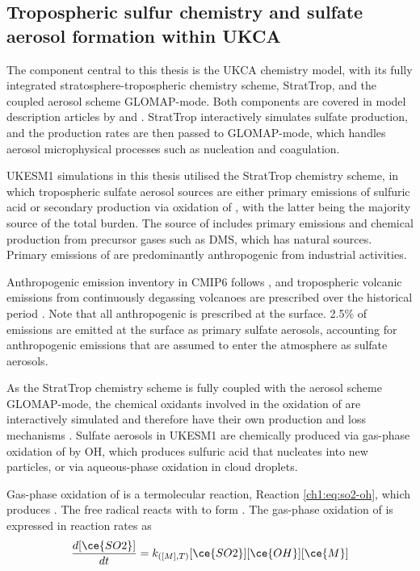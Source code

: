 \subsection{Tropospheric sulfur chemistry and sulfate aerosol formation within UKCA}
\label{ch2:sec:so4-prod-rate}

The component central to this thesis is the UKCA chemistry model, with its fully integrated stratosphere-tropospheric chemistry scheme, StratTrop, and the coupled aerosol scheme GLOMAP-mode. Both components are covered in model description articles by \citet{archibaldDescriptionEvaluationUKCA2020} and \citet{mannDescriptionEvaluationGLOMAPmode2010}. StratTrop interactively simulates sulfate production, and the production rates are then passed to GLOMAP-mode, which handles aerosol microphysical processes such as nucleation and coagulation.


UKESM1 simulations in this thesis utilised the StratTrop chemistry scheme, in which tropospheric sulfate aerosol sources are either primary emissions of sulfuric acid or secondary production via oxidation of , with the latter being the majority source of the total burden. The source of  includes primary emissions and chemical production from precursor gases such as DMS, which has natural sources. Primary emissions of  are predominantly anthropogenic from industrial activities. 


Anthropogenic  emission inventory in CMIP6 follows \citet{hoeslyHistorical175020142018}, and tropospheric volcanic emissions from continuously degassing volcanoes are prescribed over the historical period \citep{andresTimeaveragedInventorySubaerial1998, dentenerEmissionsPrimaryAerosol2006}. Note that all anthropogenic  is prescribed at the surface. 2.5\% of  emissions are emitted at the surface as primary sulfate aerosols, accounting for anthropogenic  emissions that are assumed to enter the atmosphere as sulfate aerosols. 

As the StratTrop chemistry scheme is fully coupled with the aerosol scheme GLOMAP-mode, the chemical oxidants involved in the oxidation of  are interactively simulated and therefore have their own production and loss mechanisms \citep{mulcahyDescriptionEvaluationAerosol2020}. Sulfate aerosols in UKESM1 are chemically produced via gas-phase oxidation of  by OH, which produces sulfuric acid that nucleates into new particles, or via aqueous-phase oxidation in cloud droplets. 

Gas-phase oxidation of  is a termolecular reaction, Reaction \ref{ch1:eq:so2-oh}, which produces . The free radical  reacts with  to form . The gas-phase oxidation of  is expressed in reaction rates as
\begin{align}
    \dfrac{d[\ce{SO2}]}{dt} =  k_{([M],T)} [\ce{SO2}][\ce{OH}][\ce{M}] \label{ch4:eq:so2-oh-prod}
\end{align}

